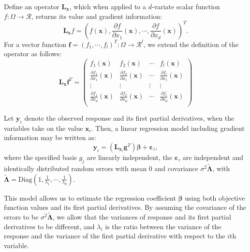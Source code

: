 \documentclass[preprint,12pt]{elsarticle}
\begin{document}
Define an operator $\mathbf{L}_{\boldsymbol{x}}$, which when applied
to a $d$-variate scalar function $f:\Omega\to \mathcal{R}$, returns
its value and gradient information:
$$\mathbf{L}_{\boldsymbol{x}}f=\left(f(\boldsymbol{x}),\frac{\partial
f}{\partial x_1}(\boldsymbol{x}),\cdots,\frac{\partial f}{\partial
x_d}(\boldsymbol{x})\right)^T.$$ For a vector function
$\boldsymbol{f}=(f_1,\cdots,f_l)^T:\Omega\to\mathcal{R}^l$, we
extend the definition of the operator as follows:
$$\mathbf{L}_{\boldsymbol{x}}\mathbf{f}^T=\left( \begin{array}{cccc}
f_1(\boldsymbol{x})&f_2(\boldsymbol{x})&\cdots&f_l\boldsymbol{(x)}\\
\frac{\partial f_1}{\partial x_1}(\boldsymbol{x})&\frac{\partial
f_2}{\partial x_1}(\boldsymbol{x})&\cdots&\frac{\partial
f_l}{\partial
x_1}(\boldsymbol{x})\\
\vdots&\vdots&\vdots&\vdots\\
\frac{\partial f_1}{\partial x_d}(\boldsymbol{x})&\frac{\partial
f_2}{\partial x_d}(\boldsymbol{x})&\cdots&\frac{\partial
f_l}{\partial
x_d}(\boldsymbol{x})\\
\end{array}\right)
$$

Let $\boldsymbol{y}_i$ denote the observed response and its first
partial derivatives, when the variables take on the value
$\boldsymbol{x}_i$. Then, a linear regression model including
gradient information may be written as:
$$\boldsymbol{y}_i=(\mathbf{L}_{\boldsymbol{x}_i}\boldsymbol{g}^T)\boldsymbol{\beta}+\boldsymbol{\varepsilon}_i,$$
where the specified basis $g_j$ are linearly independent,  the
$\boldsymbol{\varepsilon}_i$ are independent and identically
distributed random errors with mean $0$ and covariance
$\sigma^2\widetilde{\boldsymbol{\Lambda}}$, with
$\widetilde{\boldsymbol{\Lambda}}=\text{Diag}
\left(1,\frac{1}{\lambda_1}, \cdots, \frac{1}{\lambda_{d}}\right)$.

This model allows us to estimate the regression coefficient
$\boldsymbol{\beta}$ using both objective function values and its
first partial derivatives. By assuming the covariance of the errors
to be $\sigma^2\widetilde{\boldsymbol{\Lambda}}$, we allow that the
variances of response and its first partial derivatives to be
different, and $\lambda_i$ is the ratio between the variance of the
response and the variance of the first partial derivative with
respect to the $i$th variable.
\end{document}
